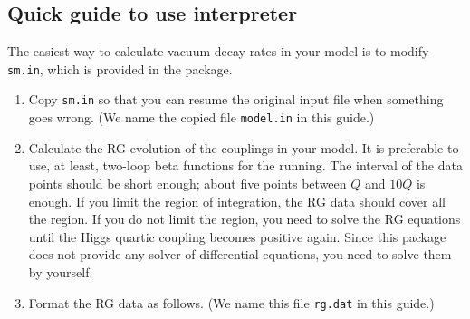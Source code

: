\documentclass[12pt]{article}
\begin{document}
\subsection{Quick guide to use interpreter}
The easiest way to calculate vacuum decay rates in your model is to modify
\verb|sm.in|, which is provided in the package.
\begin{enumerate}
 \item Copy \verb|sm.in| so that you can resume the original input file
       when something goes wrong.  (We name the copied file
       \verb|model.in| in this guide.)
 \item Calculate the RG evolution of the couplings in your model. It is
       preferable to use, at least, two-loop beta functions for the
       running. The interval of the data points should be short enough;
       about five points between $Q$ and $10Q$ is enough. If you limit
       the region of integration, the RG data should cover all the
       region. If you do not limit the region, you need to solve the RG
       equations until the Higgs quartic coupling becomes positive
       again. Since this package does not provide any solver of
       differential equations, you need to solve them by yourself.
 \item Format the RG data as follows. (We name this file \verb|rg.dat| in
       this guide.)


\end{enumerate}
\end{document}
